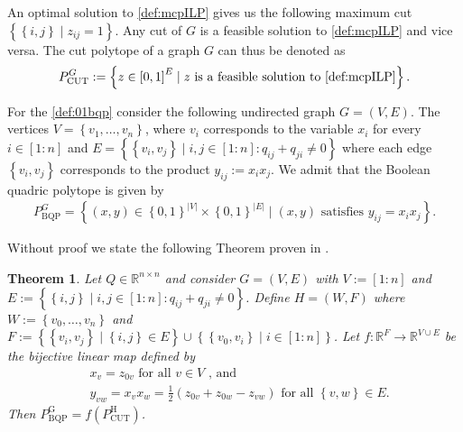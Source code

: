 \documentclass[12pt,a4paper]{article}
\theoremstyle{mythm}
\newtheorem{thm}{Theorem}[section]
\begin{document}
An optimal solution to \ref{def:mcpILP} gives us the following maximum cut $ \left\{ \left\{ i,j \right\}  \mid z _{ ij } = 1 \right\}  $.
Any cut of $ G $ is a feasible solution to \ref{def:mcpILP} and vice versa.
The cut polytope of a graph $ G $ can thus be denoted as 
\begin{align*}
P ^{ G } _{ \text{CUT}  } := \left\{ z \in \left[ 0,1 \right] ^{ E }   \mid  z \text{ is a feasible solution to } \ref{def:mcpILP} \right\}.
\end{align*} 

For the \BQP \ref{def:01bqp} consider the following undirected graph $ G = (V,E) $. The vertices $ V = \left\{ v_1, \dots , v_n \right\} $, where $ v_i $ corresponds to the
variable $ x_i $ for every $ i \in \left[ 1:n \right]  $ and $ E = \left\{ \left\{ v_i, v_j \right\}  \mid i,j \in \left[ 1:n \right] : q _{ ij } + q _{ ji } \neq 0  \right\}
$ where each edge $ \left\{ v_i , v_j \right\}  $ corresponds to the product $ y _{ ij } := x_i x_j $.
We admit that the Boolean quadric polytope is given by 
\begin{align*}
P ^{ G } _{ \text{BQP} } = \left\{ (x,y) \in \left\{ 0,1 \right\} ^{ \left| V \right|  } \times \left\{ 0, 1 \right\} ^{ \left| E \right|  }  \mid (x,y) \text{ satisfies } y
_{ ij } = x_i x_j \right\}.
\end{align*} 

Without proof we state the following Theorem proven in \cite{DeSimone1990}.
\begin{thm}
\label{thm:simone} 
Let $ Q \in \mathbb{R} ^{ n \times n }  $ and consider $ G = ( V,E ) $ with $ V := \left[ 1 : n \right] $ and $ E := \left\{ \left\{ i,j \right\}  \mid i,j \in \left[ 1:n
\right] : q _{ ij } + q _{ ji } \neq 0   \right\}  $. Define $ H = \left( W,F \right)  $ where $ W:= \left\{ v_0, \dots , v_n \right\}  $ and $ F := \left\{ \left\{ v_i,v_j
\right\}  \mid \left\{ i,j \right\} \in E \right\} \cup \left\{ \left\{ v_0,v_i \right\} \mid i \in \left[ 1:n \right]  \right\} $. 
Let $ f : \mathbb{R} ^{ F  }  \to \mathbb{R} ^{ V \cup E }  $ be the bijective linear map defined by
\begin{align*}
&x_v = z _{ 0v } \text{ for all } v \in V \text{ , and } \\
&y _{ vw } = x_v x_w = \frac{ 1 }{ 2 } \left( z _{ 0v } + z _{ 0w } - z _{ vw }  \right) \text{ for all  } \left\{ v,w \right\} \in E.
\end{align*}  
Then $ P ^{ \text{G}  }  _{ \text{BQP}  } = f \left( P ^{ \text{H}  } _{ \text{CUT}  }  \right)   $.
\end{thm} 
\end{document}
